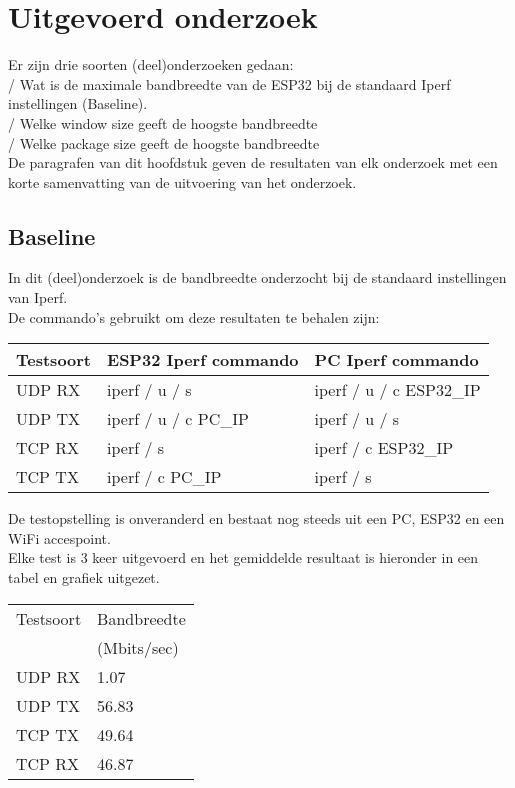 \documentclass[../DCM2_Verslag.tex]{subfiles}
\begin{document}
\section{Uitgevoerd onderzoek}
Er zijn drie soorten (deel)onderzoeken gedaan:\\
\-/ Wat is de maximale bandbreedte van de ESP32 bij de standaard Iperf instellingen (Baseline).\\
\-/ Welke window size geeft de hoogste bandbreedte\\
\-/ Welke package size geeft de hoogste bandbreedte\\
De paragrafen van dit hoofdstuk geven de resultaten van elk onderzoek met een korte samenvatting van de uitvoering van het onderzoek.
\clearpage
\subsection{Baseline}
In dit (deel)onderzoek is de bandbreedte onderzocht bij de standaard instellingen van Iperf. \\
De commando's gebruikt om deze resultaten te behalen zijn:\\
\begin{center}
\begin{tabular}{||l|l|l|}
   	 Testsoort & ESP32 Iperf commando & PC Iperf commando\\
   	 \hline \hline    
   	 UDP RX & iperf \-/ u \-/ s & iperf \-/ u \-/ c ESP32\_IP \\
   	 UDP TX & iperf \-/ u \-/ c PC\_IP & iperf \-/ u \-/ s \\
   	 TCP RX & iperf \-/ s & iperf \-/ c ESP32\_IP  \\
   	 TCP TX & iperf \-/ c PC\_IP & iperf \-/ s \\   	 
   	 \hline
	\end{tabular}
\end{center}
De testopstelling is onveranderd en bestaat nog steeds uit een PC, ESP32 en een WiFi accespoint.\\
Elke test is 3 keer uitgevoerd en het gemiddelde resultaat is hieronder in een tabel en grafiek uitgezet.\\
\begin{tabular}{||l|l||}
   	 Testsoort & Bandbreedte \\ & (Mbits/sec)\\
   	 \hline \hline    
   	 UDP RX & 1.07\\
   	 UDP TX & 56.83 \\
   	 TCP TX & 49.64\\
   	 TCP RX & 46.87\\
   	 \hline
	\end{tabular}
\end{document}
